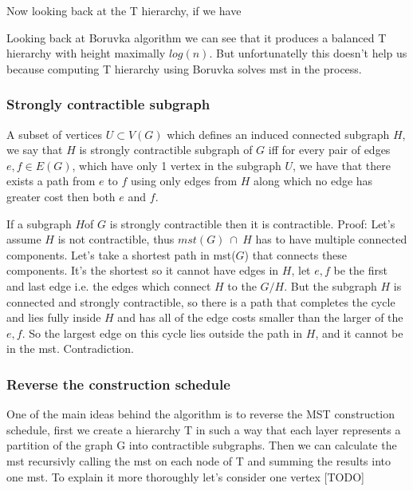 \documentclass{article}
\begin{document}
Now looking back at the T hierarchy, if we have 

Looking back at Boruvka algorithm we can see that it produces a balanced T hierarchy with height maximally $log(n)$. But unfortunatelly this doesn't help us because computing T hierarchy using Boruvka solves mst in the process.


\subsubsection{Strongly contractible subgraph}
A subset of vertices $U \subset V(G)$ which defines an induced connected subgraph $H$, we say that $H$ is strongly contractible subgraph of $G$ iff for every pair of edges $e,f \in E(G)$, which have only 1 vertex in the subgraph $U$, we have that there exists a path from $e$ to $f$ using only edges from $H$ along which no edge has greater cost then both $e$ and $f$. 

If a subgraph $H$of $G$ is strongly contractible then it is contractible. Proof:
Let's assume $H$ is not contractible, thus $mst(G)\ \cap\ H$ has to have multiple connected components. Let's take a shortest path in mst($G$) that connects these components. It's the shortest so it cannot have edges in $H$, let $e, f$ be the first and last edge i.e. the edges which connect $H$ to the $G/H$. But the subgraph $H$ is connected and strongly contractible, so there is a path that completes the cycle and lies fully inside $H$ and has all of the edge costs smaller than the larger of the $e, f$. So the largest edge on this cycle lies outside the path in $H$, and it cannot be in the mst. Contradiction. 

\subsubsection{Reverse the construction schedule}
One of the main ideas behind the algorithm is to reverse the MST construction schedule, first we create a hierarchy T in such a way that each layer represents a partition of the graph G into contractible subgraphs. Then we can calculate the mst recursivly calling the mst on each node of T and summing the results into one mst. To explain it more thoroughly let's consider one vertex [TODO]
\end{document}

